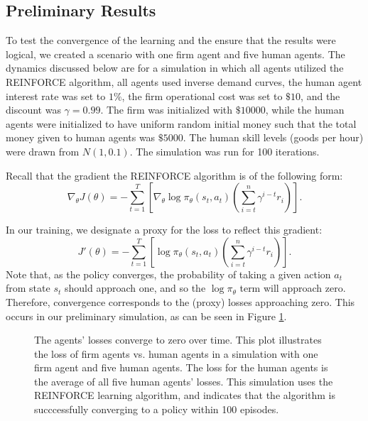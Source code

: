 \documentclass[twoside,twocolumn]{article}
\begin{document}
\subsection{Preliminary Results}

To test the convergence of the learning and the ensure that the results were logical, we created a scenario with one firm agent and five human agents. The dynamics discussed below are for a simulation in which all agents utilized the REINFORCE algorithm, all agents used inverse demand curves, the human agent interest rate was set to $1\%$, the firm operational cost was set to $\$10$, and the discount was $\gamma = 0.99$. The firm was initialized with $\$10000$, while the human agents were initialized to have uniform random initial money such that the total money given to human agents was $\$5000$. The human skill levels (goods per hour) were drawn from $N(1, 0.1)$. The simulation was run for 100 iterations. 

\medskip 

Recall that the gradient the REINFORCE algorithm is of the following form:
\[
  \nabla_{\theta} J(\theta) = -\sum_{t = 1}^T \left[\nabla_{\theta} \log \pi_\theta(s_t, a_t) \left( \sum_{i = t}^n \gamma^{i - t}r_i \right) \right].  
\]

In our training, we designate a proxy for the loss to reflect this gradient:
\[
  J'(\theta) = -\sum_{t = 1}^T \left[\log \pi_\theta(s_t, a_t) \left( \sum_{i = t}^n \gamma^{i - t}r_i \right) \right].  
\]
Note that, as the policy converges, the probability of taking a given action $a_t$ from state $s_t$ should approach one, and so the $\log \pi_\theta$ term will approach zero. Therefore, convergence corresponds to the (proxy) losses approaching zero. This occurs in our preliminary simulation, as can be seen in Figure \ref{plt:losstozero}.

\begin{figure}[h]
\caption{The agents' losses converge to zero over time. This plot illustrates the loss of firm agents vs. human agents in a simulation with one firm agent and five human agents. The loss for the human agents is the average of all five human agents' losses. This simulation uses the REINFORCE learning algorithm, and indicates that the algorithm is succcessfully converging to a policy within 100 episodes.}
\label{plt:losstozero}
\end{figure}
\end{document}
